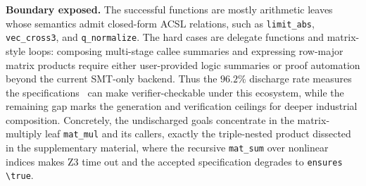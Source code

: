 \DIFaddbegin
\smallskip
\noindent\textbf{Boundary exposed.}
The successful functions are mostly arithmetic leaves whose semantics admit closed-form ACSL relations, such as \texttt{limit\_abs}, \texttt{vec\_cross3}, and \texttt{q\_normalize}. The hard cases are delegate functions and matrix-style loops: composing multi-stage callee summaries and expressing row-major matrix products require either user-provided logic summaries or proof automation beyond the current SMT-only backend. Thus the $96.2\%$ discharge rate measures the specifications \toolname\ can make verifier-checkable under this ecosystem, while the remaining gap marks the generation and verification ceilings for deeper industrial composition. Concretely, the undischarged goals concentrate in the matrix-multiply leaf \texttt{mat\_mul} and its callers, exactly the triple-nested product dissected in the supplementary material, where the recursive \texttt{mat\_sum} over nonlinear indices makes Z3 time out and the accepted specification degrades to \texttt{ensures \textbackslash true}.
\DIFaddend
